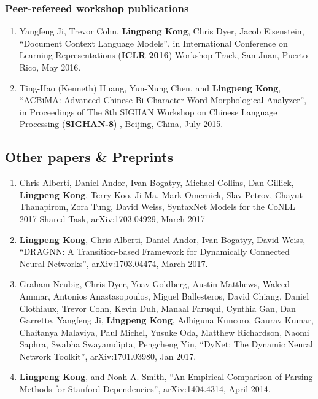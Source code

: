\documentclass[letterpaper]{article}
\begin{document}
\subsubsection*{Peer-refereed workshop publications}
\begin{enumerate}
\item \label{iclr2016workshop} Yangfeng Ji, Trevor Cohn, \textbf{Lingpeng Kong}, Chris Dyer, Jacob Eisenstein, ``Document Context Language Models'', in International Conference on Learning Representations (\textbf{ICLR 2016}) Workshop Track, San Juan, Puerto Rico, May 2016.

\item \label{sighan8} Ting-Hao (Kenneth) Huang, Yun-Nung Chen, and \textbf{Lingpeng Kong}, ``ACBiMA: Advanced Chinese Bi-Character Word Morphological Analyzer'', in Proceedings of The 8th SIGHAN Workshop on Chinese Language Processing (\textbf{SIGHAN-8}) , Beijing, China, July 2015.
\end{enumerate}

\subsection*{Other papers \& Preprints}
\begin{enumerate}
\item \label{conll2017task} Chris Alberti, Daniel Andor, Ivan Bogatyy, Michael Collins, Dan Gillick, \textbf{Lingpeng Kong}, Terry Koo, Ji Ma, Mark Omernick, Slav Petrov, Chayut Thanapirom, Zora Tung, David Weiss, SyntaxNet Models for the CoNLL 2017 Shared Task, arXiv:1703.04929, March 2017
\item \label{dragnn} \textbf{Lingpeng Kong}, Chris Alberti, Daniel Andor, Ivan Bogatyy, David Weiss, ``DRAGNN: A Transition-based Framework for Dynamically Connected Neural Networks'', arXiv:1703.04474, March 2017.
\item \label{cnnpaper} Graham Neubig, Chris Dyer, Yoav Goldberg, Austin Matthews, Waleed Ammar, Antonios Anastasopoulos, Miguel Ballesteros, David Chiang, Daniel Clothiaux, Trevor Cohn, Kevin Duh, Manaal Faruqui, Cynthia Gan, Dan Garrette, Yangfeng Ji, \textbf{Lingpeng Kong}, Adhiguna Kuncoro, Gaurav Kumar, Chaitanya Malaviya, Paul Michel, Yusuke Oda, Matthew Richardson, Naomi Saphra, Swabha Swayamdipta, Pengcheng Yin, ``DyNet: The Dynamic Neural Network Toolkit'', arXiv:1701.03980, Jan 2017.
\item \label{sdpaper} \textbf{Lingpeng Kong}, and Noah A. Smith, ``An Empirical Comparison of Parsing Methods for Stanford Dependencies'', arXiv:1404.4314, April 2014.

\end{enumerate}
\end{document}
